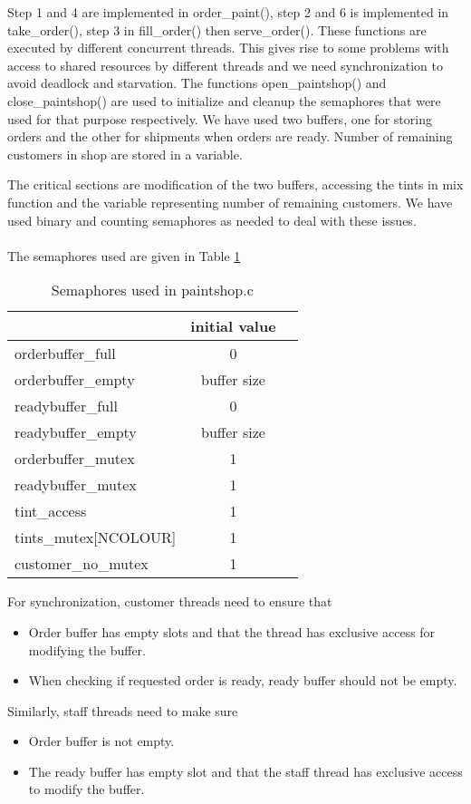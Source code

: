 \documentclass[11pt, english]{article}
\begin{document}
Step 1 and 4 are implemented in order\_paint(), step 2 and 6 is implemented in take\_order(), step 3 in fill\_order() then serve\_order(). These functions are executed by different concurrent threads. This gives rise to some problems with access to shared resources by different threads and we need synchronization to avoid deadlock and starvation. The functions open\_paintshop() and close\_paintshop() are used to initialize and cleanup the semaphores that were used for that purpose respectively. We have used two buffers, one for storing orders and the other for shipments when orders are ready. Number of remaining customers in shop are stored in a variable. 

The critical sections are modification of the two buffers, accessing the tints in mix function and the variable representing number of remaining customers. We have used binary and counting semaphores as needed to deal with these issues.\\ \\
The semaphores used are given in Table \ref{tbl1}

\begin{table}[h!]
\centering
\begin{tabular}{|l|c|l|}
\hline
\textbf{} & \textbf{initial value}\\ \hline
orderbuffer\_full & 0 \\ \hline
orderbuffer\_empty & buffer size \\ \hline
readybuffer\_full & 0 \\ \hline
readybuffer\_empty & buffer size \\ \hline
orderbuffer\_mutex & 1 \\ \hline
readybuffer\_mutex & 1 \\ \hline
tint\_access & 1 \\ \hline
tints\_mutex[NCOLOUR] & 1 \\ \hline
customer\_no\_mutex & 1 \\ \hline
\end{tabular}
\caption{Semaphores used in paintshop.c}
\label{tbl1}
\end{table}

For synchronization, customer threads need to ensure that
\begin{itemize}
\item Order buffer has empty slots and that the thread has exclusive access for modifying the buffer.
\item When checking if requested order is ready, ready buffer should not be empty.
\end{itemize}
Similarly, staff threads need to make sure
\begin{itemize}
\item Order buffer is not empty.
\item The ready buffer has empty slot and that the staff thread has exclusive access to modify the buffer.
\end{itemize}
\end{document}
